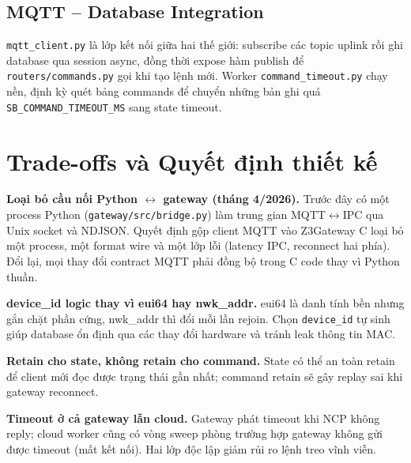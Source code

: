 \subsection{MQTT -- Database Integration}
\label{sec:ch2-mqtt-db}

\texttt{mqtt\_client.py} là lớp kết nối giữa hai thế giới: subscribe
các topic uplink rồi ghi database qua session async, đồng thời expose
hàm publish để \texttt{routers/commands.py} gọi khi tạo lệnh mới.
Worker \texttt{command\_timeout.py} chạy nền, định kỳ quét bảng
commands để chuyển những bản ghi quá
\texttt{SB\_COMMAND\_TIMEOUT\_MS} sang state timeout.

\section{Trade-offs và Quyết định thiết kế}
\label{sec:ch2-tradeoffs}

\textbf{Loại bỏ cầu nối Python $\leftrightarrow$ gateway (tháng
4/2026).} Trước đây có một process Python
(\texttt{gateway/src/bridge.py}) làm trung gian
MQTT$\leftrightarrow$IPC qua Unix socket và NDJSON. Quyết định gộp
client MQTT vào Z3Gateway C loại bỏ một process, một format wire và
một lớp lỗi (latency IPC, reconnect hai phía). Đổi lại, mọi thay
đổi contract MQTT phải đồng bộ trong C code thay vì Python thuần.

\textbf{device\_id logic thay vì eui64 hay nwk\_addr.} eui64 là danh
tính bền nhưng gắn chặt phần cứng, nwk\_addr thì đổi mỗi lần
rejoin. Chọn \texttt{device\_id} tự sinh giúp database ổn định qua
các thay đổi hardware và tránh leak thông tin MAC.

\textbf{Retain cho state, không retain cho command.} State có thể an
toàn retain để client mới đọc được trạng thái gần nhất; command
retain sẽ gây replay sai khi gateway reconnect.

\textbf{Timeout ở cả gateway lẫn cloud.} Gateway phát timeout khi
NCP không reply; cloud worker cũng có vòng sweep phòng trường hợp
gateway không gửi được timeout (mất kết nối). Hai lớp độc lập giảm
rủi ro lệnh treo vĩnh viễn.


\newpage

